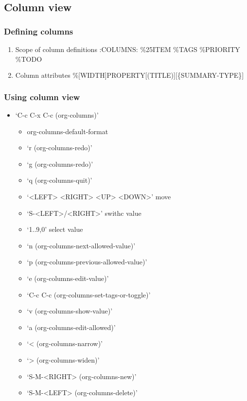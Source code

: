\documentclass[11pt]{article}
\begin{document}
\subsection{Column view}
\label{sec:org87f789e}
\subsubsection{Defining columns}
\label{sec:orge6f7124}
\begin{enumerate}
\item Scope of column definitions
\label{sec:org3333ef2}
:COLUMNS: \%25ITEM \%TAGS \%PRIORITY \%TODO
\item Column attributes
\label{sec:org7b8d0d1}
\%[WIDTH]PROPERTY[(TITLE)][\{SUMMARY-TYPE\}]
\end{enumerate}
\subsubsection{Using column view}
\label{sec:org0719116}
\begin{itemize}
\item ‘C-c C-x C-c     (org-columns)’
\begin{itemize}
\item org-columns-default-format
\item ‘r     (org-columns-redo)’
\item ‘g     (org-columns-redo)’
\item ‘q     (org-columns-quit)’
\item ‘<LEFT> <RIGHT> <UP> <DOWN>’ move
\item ‘S-<LEFT>/<RIGHT>’ swithc value
\item ‘1..9,0’  select value
\item ‘n     (org-columns-next-allowed-value)’
\item ‘p     (org-columns-previous-allowed-value)’
\item ‘e     (org-columns-edit-value)’
\item ‘C-c C-c     (org-columns-set-tags-or-toggle)’
\item ‘v     (org-columns-show-value)’
\item ‘a     (org-columns-edit-allowed)’
\item ‘<     (org-columns-narrow)’
\item ‘>     (org-columns-widen)’
\item ‘S-M-<RIGHT>     (org-columns-new)’
\item ‘S-M-<LEFT>     (org-columns-delete)’
\end{itemize}
\end{itemize}
\end{document}
